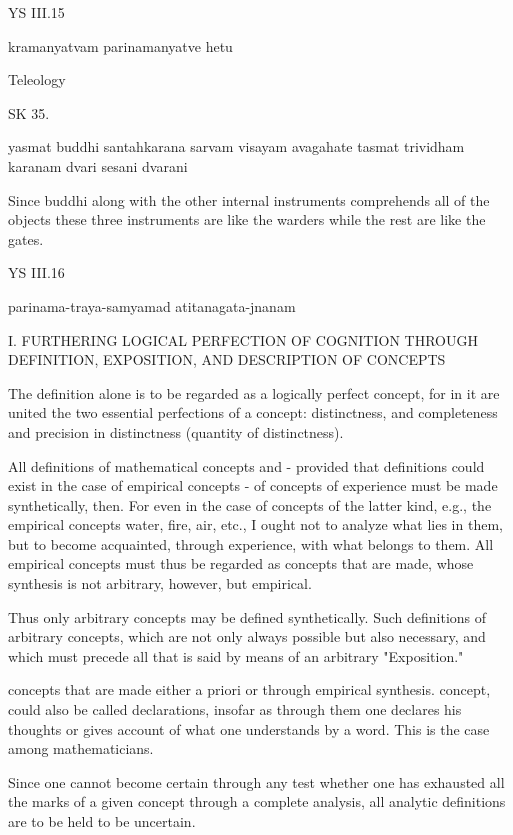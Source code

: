YS III.15

    kramanyatvam parinamanyatve hetu

    Teleology

SK 35.


yasmat buddhi santahkarana sarvam visayam avagahate
tasmat trividham karanam dvari sesani dvarani

Since buddhi along with the other internal instruments
comprehends all of the objects these three instruments are
like the warders while the rest are like the gates.

YS III.16

    parinama-traya-samyamad atitanagata-jnanam

    I. FURTHERING LOGICAL PERFECTION OF COGNITION THROUGH
    DEFINITION, EXPOSITION, AND DESCRIPTION OF CONCEPTS

    The definition alone is to be regarded as a logically perfect concept,
    for in it are united the two essential perfections of a concept:
    distinctness, and completeness and precision in distinctness (quantity of distinctness).

    All definitions of mathematical concepts and - provided that definitions
    could exist in the case of empirical concepts - of concepts of experience
    must be made synthetically, then. For even in the case of concepts of the
    latter kind, e.g., the empirical concepts water, fire, air, etc.,
    I ought not to analyze what lies in them, but to become acquainted,
    through experience, with what belongs to them.
    All empirical concepts must thus be regarded as concepts that are made,
    whose synthesis is not arbitrary, however, but empirical.

    Thus only arbitrary concepts may be defined synthetically.
    Such definitions of arbitrary concepts, which are not only always possible but
    also necessary, and which must precede all that is said
    by means of an arbitrary "Exposition."

    concepts that are made either a priori or through empirical synthesis.
    concept, could also be called declarations, insofar as through them one
    declares his thoughts or gives account of what one understands by a word.
    This is the case among mathematicians.

    Since one cannot become certain through any test whether one has
    exhausted all the marks of a given concept through a complete analysis,
    all analytic definitions are to be held to be uncertain.

